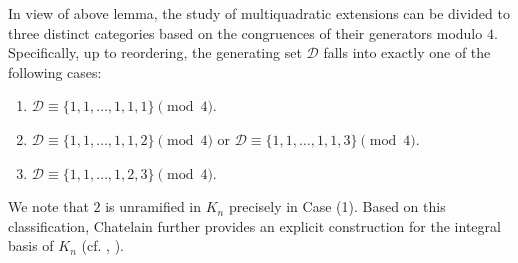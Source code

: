 \documentclass{amsart}
\theoremstyle{plain}
\theoremstyle{definition}
\theoremstyle{remark}
\numberwithin{equation}{section}
\begin{document}
In view of above lemma, the study of multiquadratic extensions can be divided to three distinct categories based on the congruences of their generators modulo $4$. Specifically, up to reordering, the generating set $\mathcal{D}$ falls into exactly one of the following cases:
\begin{enumerate}
    \item $\mathcal{D} \equiv \{1, 1, \ldots, 1, 1, 1\} \pmod 4$.
    \item $\mathcal{D} \equiv \{1, 1, \ldots, 1, 1, 2\} \pmod 4$ \quad or \quad $\mathcal{D} \equiv \{1, 1, \ldots, 1, 1, 3\} \pmod 4$.
    \item $\mathcal{D} \equiv \{1, 1, \ldots, 1, 2, 3\} \pmod 4$.
\end{enumerate}We note that $2$ is unramified in $K_n$ precisely in Case (1). Based on this classification, Chatelain further provides an explicit construction for the integral basis of $K_n$ (cf. \cite{Chatelain}, \cite[Theorem 2.1]{Man}).
\end{document}
